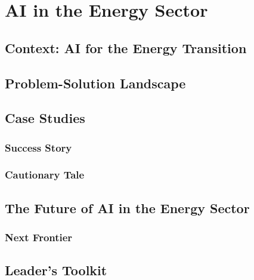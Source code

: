 \chapter{AI in the Energy Sector}
\label{chap:ai_in_energy}

\section{Context: AI for the Energy Transition}
\label{sec:energy_context}

\section{Problem-Solution Landscape}
\label{sec:energy_problem_solution}

\section{Case Studies}
\label{sec:energy_case_studies}
\subsection{Success Story}
\label{sec:energy_success_story}
\subsection{Cautionary Tale}
\label{sec:energy_cautionary_tale}

\section{The Future of AI in the Energy Sector}
\label{sec:future_of_ai_in_energy}
\subsection{Next Frontier}
\label{sec:energy_next_frontier}

\section{Leader's Toolkit}
\label{sec:energy_leaders_toolkit}